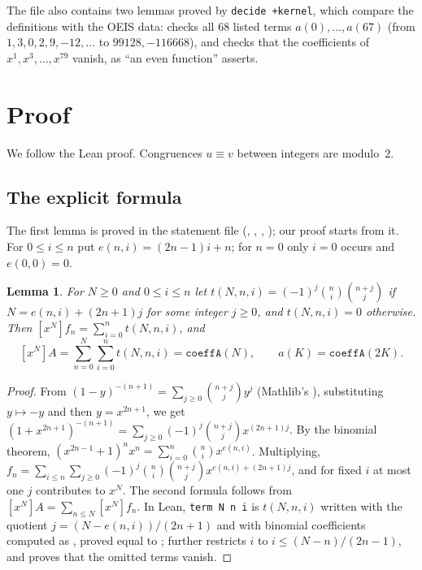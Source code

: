 \documentclass[11pt]{amsart}
\theoremstyle{plain}
\newtheorem{lemma}[theorem]{Lemma}
\theoremstyle{definition}
\newcommand{\co}[1]{[x^{#1}]}
\begin{document}
The file also contains two lemmas proved by \texttt{decide +kernel}, which compare the definitions with the OEIS data:  checks all $68$ listed terms $a(0),\dots,a(67)$ (from $1,3,0,2,9,-12,\dots$ to $99128,-116668$), and  checks that the coefficients of $x^1,x^3,\dots,x^{79}$ vanish, as ``an even function'' asserts.

\section{Proof}\label{sec:proof}

We follow the Lean proof. Congruences $u\equiv v$ between integers are modulo~$2$.

\subsection{The explicit formula}
The first lemma is proved in the statement file (, , , ); our proof starts from it.
For $0\le i\le n$ put $e(n,i)=(2n-1)i+n$; for $n=0$ only $i=0$ occurs and $e(0,0)=0$.

\begin{lemma}\label{lem:formula}
For $N\ge0$ and $0\le i\le n$ let $t(N,n,i)=(-1)^j\binom ni\binom{n+j}{j}$ if $N=e(n,i)+(2n+1)j$ for some integer $j\ge0$, and $t(N,n,i)=0$ otherwise. Then $\co Nf_n=\sum_{i=0}^{n}t(N,n,i)$, and
\[
  \co NA=\sum_{n=0}^{N}\sum_{i=0}^{n}t(N,n,i)=\texttt{coeffA}(N),\qquad a(K)=\texttt{coeffA}(2K).
\]
\end{lemma}

\begin{proof}
From $(1-y)^{-(n+1)}=\sum_{j\ge0}\binom{n+j}{j}y^j$ (Mathlib's ), substituting $y\mapsto-y$ and then $y=x^{2n+1}$, we get $(1+x^{2n+1})^{-(n+1)}=\sum_{j\ge0}(-1)^j\binom{n+j}{j}x^{(2n+1)j}$. By the binomial theorem, $(x^{2n-1}+1)^nx^n=\sum_{i=0}^n\binom nix^{e(n,i)}$. Multiplying, $f_n=\sum_{i\le n}\sum_{j\ge0}(-1)^j\binom ni\binom{n+j}jx^{e(n,i)+(2n+1)j}$, and for fixed $i$ at most one $j$ contributes to $x^N$. The second formula follows from $\co NA=\sum_{n\le N}\co Nf_n$. In Lean, \texttt{term N n i} is $t(N,n,i)$ written with the quotient $j=(N-e(n,i))/(2n+1)$ and with binomial coefficients computed as , proved equal to ;  further restricts $i$ to $i\le(N-n)/(2n-1)$, and  proves that the omitted terms vanish.
\end{proof}
\end{document}

